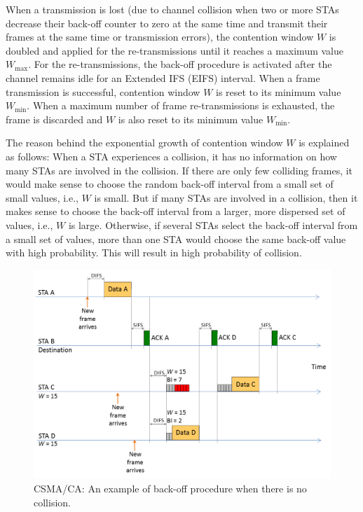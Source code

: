 When a transmission is lost (due to channel collision when two or more STAs decrease their back-off counter to zero at the same time and transmit their frames at the same time or transmission errors), the contention window $W$ is doubled and applied for the re-transmissions until it reaches a maximum value $W_{\max}$. For the re-transmissions, the back-off procedure is activated after the channel remains idle for an Extended IFS (EIFS) interval. When a frame transmission is successful, contention window $W$ is reset to its minimum value $W_{\min}$. When a maximum number of frame re-transmissions is exhausted, the frame is discarded and $W$ is also reset to its minimum value $W_{\min}$.


The reason behind the exponential growth of contention window $W$ is explained as follows: When a STA experiences a collision, it has no information on how many STAs are involved in the collision. If there are only few colliding frames, it would make sense to choose the random back-off interval from a small set of small values, i.e., $W$ is small. But if many STAs are involved in a collision, then it makes sense to choose the back-off interval from a larger, more dispersed set of values, i.e., $W$ is large. Otherwise, if several STAs select the back-off interval from a small set of values, more than one STA would choose the same back-off value with high probability. This will result in high probability of collision.
\begin{figure}[!t]
	\centering
	\includegraphics[width=\columnwidth]{figs/CSMA-CA-back-off-no-collision}
	\caption{CSMA/CA: An example of back-off procedure when there is no collision.}
	\label{figs:CSMA-CA-back-off-no-collision}
\end{figure}

